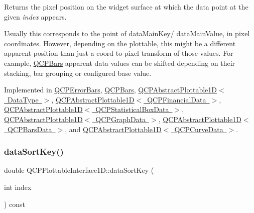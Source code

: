 Returns the pixel position on the widget surface at which the data point at the given {\itshape index} appears.

Usually this corresponds to the point of data\+Main\+Key/ data\+Main\+Value, in pixel coordinates. However, depending on the plottable, this might be a different apparent position than just a coord-\/to-\/pixel transform of those values. For example, \mbox{\hyperlink{class_q_c_p_bars}{Q\+C\+P\+Bars}} apparent data values can be shifted depending on their stacking, bar grouping or configured base value. 

Implemented in \mbox{\hyperlink{class_q_c_p_error_bars_ae79fed6566f1912a97344b20b35faac1}{Q\+C\+P\+Error\+Bars}}, \mbox{\hyperlink{class_q_c_p_bars_a55cdaf565cd3384158d1f7f89533bc2d}{Q\+C\+P\+Bars}}, \mbox{\hyperlink{class_q_c_p_abstract_plottable1_d_a6ca0699a6af5f25a7565de7c50ce13b2}{Q\+C\+P\+Abstract\+Plottable1\+D$<$ Data\+Type $>$}}, \mbox{\hyperlink{class_q_c_p_abstract_plottable1_d_a6ca0699a6af5f25a7565de7c50ce13b2}{Q\+C\+P\+Abstract\+Plottable1\+D$<$ Q\+C\+P\+Financial\+Data $>$}}, \mbox{\hyperlink{class_q_c_p_abstract_plottable1_d_a6ca0699a6af5f25a7565de7c50ce13b2}{Q\+C\+P\+Abstract\+Plottable1\+D$<$ Q\+C\+P\+Statistical\+Box\+Data $>$}}, \mbox{\hyperlink{class_q_c_p_abstract_plottable1_d_a6ca0699a6af5f25a7565de7c50ce13b2}{Q\+C\+P\+Abstract\+Plottable1\+D$<$ Q\+C\+P\+Graph\+Data $>$}}, \mbox{\hyperlink{class_q_c_p_abstract_plottable1_d_a6ca0699a6af5f25a7565de7c50ce13b2}{Q\+C\+P\+Abstract\+Plottable1\+D$<$ Q\+C\+P\+Bars\+Data $>$}}, and \mbox{\hyperlink{class_q_c_p_abstract_plottable1_d_a6ca0699a6af5f25a7565de7c50ce13b2}{Q\+C\+P\+Abstract\+Plottable1\+D$<$ Q\+C\+P\+Curve\+Data $>$}}.

\mbox{\label{class_q_c_p_plottable_interface1_d_afdc92f9f01e7e35f2e96b2ea9dc14ae7}} 
\subsubsection{\texorpdfstring{dataSortKey()}{dataSortKey()}}
{\footnotesize\ttfamily double Q\+C\+P\+Plottable\+Interface1\+D\+::data\+Sort\+Key (\begin{DoxyParamCaption}\item[{int}]{index }\end{DoxyParamCaption}) const\hspace{0.3cm}{\ttfamily [pure virtual]}}


